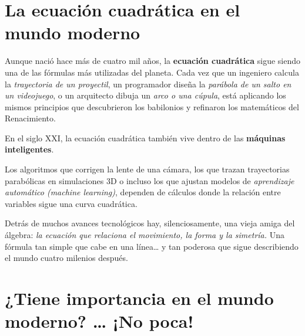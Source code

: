 \section*{La ecuación cuadrática en el mundo moderno}

\begin{reseñaplana}
Aunque nació hace más de cuatro mil años, la \textbf{ecuación cuadrática} sigue siendo una de las fórmulas 
más utilizadas del planeta.  
Cada vez que un ingeniero calcula la \textit{trayectoria de un proyectil}, un programador diseña 
la \textit{parábola de un salto en un videojuego}, o un arquitecto dibuja un \textit{arco o una cúpula}, 
está aplicando los mismos principios que descubrieron los babilonios y refinaron los matemáticos del Renacimiento.  

En el siglo XXI, la ecuación cuadrática también vive dentro de las \textbf{máquinas inteligentes}.

Los algoritmos que corrigen la lente de una cámara, los que trazan trayectorias parabólicas en 
simulaciones 3D o incluso los que ajustan modelos de \textit{aprendizaje automático (machine learning)}, 
dependen de cálculos donde la relación entre variables sigue una curva cuadrática.  

Detrás de muchos avances tecnológicos hay, silenciosamente, una vieja amiga del álgebra:  
\textit{la ecuación que relaciona el movimiento, la forma y la simetría.}  
Una fórmula tan simple que cabe en una línea… y tan poderosa que sigue describiendo el mundo cuatro milenios después.
\end{reseñaplana}


\section*{¿Tiene importancia en el mundo moderno? \ldots{} \textbf{¡No poca!}}

